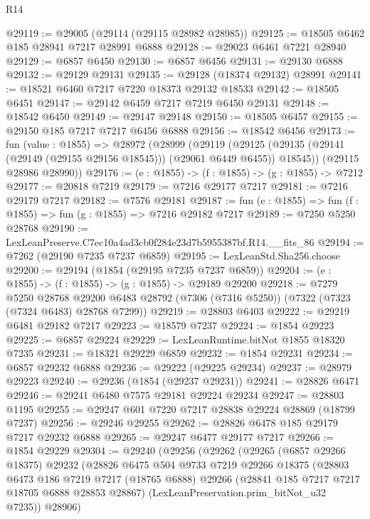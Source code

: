 \begin{lexlean}{R14}
\begin{coremodule}
@29119 := @29005 (@29114 (@29115 @28982 @28985))
@29125 := @18505 @6462 @185 @28941 @7217 @28991 @6888
@29128 := @29023 @6461 @7221 @28940
@29129 := @6857 @6450
@29130 := @6857 @6456
@29131 := @29130 @6888
@29132 := @29129 @29131
@29135 := @29128 (@18374 @29132) @28991
@29141 := @18521 @6460 @7217 @7220 @18373 @29132 @18533
@29142 := @18505 @6451
@29147 := @29142 @6459 @7217 @7219 @6450 @29131
@29148 := @18542 @6450
@29149 := @29147 @29148
@29150 := @18505 @6457
@29155 := @29150 @185 @7217 @7217 @6456 @6888
@29156 := @18542 @6456
@29173 := fun (value : @1855) =>
  @28972
    (@28999
      (@29119
        (@29125 (@29135 (@29141 (@29149 (@29155 @29156 @18545))) (@29061 @6449 @6455)) @18545))
      (@29115 @28986 @28990))
@29176 := (e : @1855) -> (f : @1855) -> (g : @1855) -> @7212
@29177 := @20818 @7219
@29179 := @7216 @29177 @7217
@29181 := @7216 @29179 @7217
@29182 := @7576 @29181
@29187 := fun (e : @1855) => fun (f : @1855) => fun (g : @1855) => @7216 @29182 @7217
@29189 := @7250 @5250 @28768
@29190 := LexLeanPreserve.C7ec10a4ad3cb0f284e23d7b5955387bf.R14.__fits_86
@29194 := @7262 (@29190 @7235 @7237 @6859)
@29195 := LexLeanStd.Sha256.choose
@29200 := @29194 (@1854 (@29195 @7235 @7237 @6859))
@29204 := (e : @1855) -> (f : @1855) -> (g : @1855) -> @29189 @29200
@29218 := @7279
    @5250
    @28768
    @29200
    @6483
    @28792
    (@7306 (@7316 @5250))
    (@7322 (@7323 (@7324 @6483) @28768 @7299))
@29219 := @28803 @6403
@29222 := @29219 @6481 @29182 @7217
@29223 := @18579 @7237
@29224 := @1854 @29223
@29225 := @6857 @29224
@29229 := LexLeanRuntime.bitNot @1855 @18320 @7235
@29231 := @18321 @29229 @6859
@29232 := @1854 @29231
@29234 := @6857 @29232 @6888
@29236 := @29222 (@29225 @29234)
@29237 := @28979 @29223
@29240 := @29236 (@1854 (@29237 @29231))
@29241 := @28826 @6471
@29246 := @29241 @6480 @7575 @29181 @29224 @29234
@29247 := @28803 @1195
@29255 := @29247 @601 @7220 @7217 @28838 @29224 @28869 (@18799 @7237)
@29256 := @29246 @29255
@29262 := @28826 @6478 @185 @29179 @7217 @29232 @6888
@29265 := @29247 @6477 @29177 @7217
@29266 := @1854 @29229
@29304 := @29240
    (@29256
      (@29262
        (@29265
          (@6857 @29266 @18375)
          @29232
          (@28826
            @6475
            @504
            @9733
            @7219
            @29266
            @18375
            (@28803
              @6473
              @186
              @7219
              @7217
              (@18765 @6888)
              @29266
              (@28841 @185 @7217 @7217 @18705 @6888 @28853 @28867)
              (LexLeanPreservation.prim_bitNot_u32 @7235))
            @28906)

\end{coremodule}
\end{lexlean}
